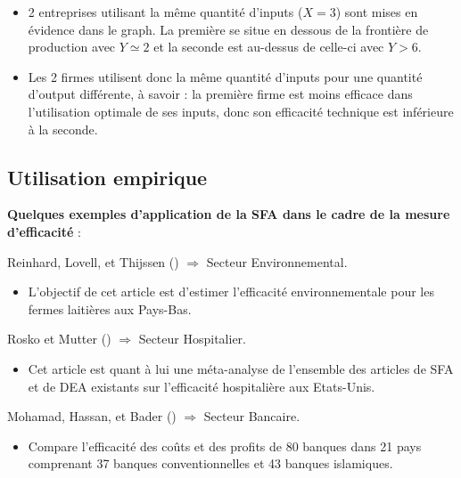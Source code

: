 \documentclass[
  12pt,
]{report}
\providecommand{\tightlist}{%
  \setlength{\itemsep}{0pt}\setlength{\parskip}{0pt}}\usepackage{longtable,booktabs,array}
\begin{document}
\begin{itemize}
\item
  2 entreprises utilisant la même quantité d'inputs (\(X=3\)) sont mises
  en évidence dans le graph. La première se situe en dessous de la
  frontière de production avec \(Y \simeq 2\) et la seconde est
  au-dessus de celle-ci avec \(Y>6\).
\item
  Les 2 firmes utilisent donc la même quantité d'inputs pour une
  quantité d'output différente, à savoir : la première firme est moins
  efficace dans l'utilisation optimale de ses inputs, donc son
  efficacité technique est inférieure à la seconde.
\end{itemize}

\newpage

\subsection{Utilisation empirique}\label{utilisation-empirique}

\textbf{Quelques exemples d'application de la SFA dans le cadre de la
mesure d'efficacité} :

Reinhard, Lovell, et Thijssen ()
\(\Rightarrow\) Secteur Environnemental.

\begin{itemize}
\tightlist
\item
  L'objectif de cet article est d'estimer l'efficacité environnementale
  pour les fermes laitières aux Pays-Bas.
\end{itemize}

Rosko et Mutter () \(\Rightarrow\) Secteur
Hospitalier.

\begin{itemize}
\tightlist
\item
  Cet article est quant à lui une méta-analyse de l'ensemble des
  articles de SFA et de DEA existants sur l'efficacité hospitalière aux
  Etats-Unis.
\end{itemize}

Mohamad, Hassan, et Bader ()
\(\Rightarrow\) Secteur Bancaire.

\begin{itemize}
\tightlist
\item
  Compare l'efficacité des coûts et des profits de 80 banques dans 21
  pays comprenant 37 banques conventionnelles et 43 banques islamiques.
\end{itemize}
\end{document}
